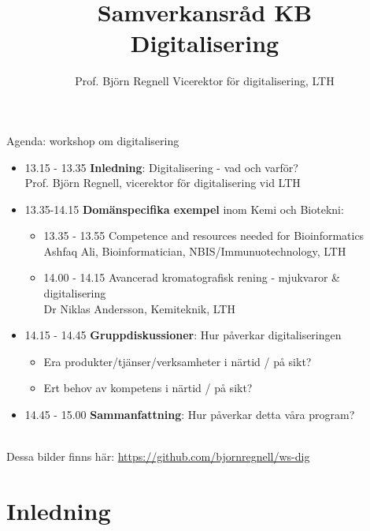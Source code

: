 \documentclass[aspectratio=169]{beamer}
\title[B. Regnell, \today]{\selectfont Samverkansråd KB\\ Digitalisering}
\author[\href{https://github.com/bjornregnell/ws-dig}{github.com/bjornregnell/ws-dig}]{%
  Prof. Björn Regnell\newline
  Vicerektor för digitalisering, LTH}
\newcommand{\TitleSlide}{\begin{frame}[plain]\titlepage\end{frame}}
\newenvironment{Slide}[1]%
  {\begin{frame}[environment=Slide]{#1}}
  {\end{frame}}%
\begin{document}
\TitleSlide


\begin{Slide}{Agenda: workshop om digitalisering}
\begin{itemize}
    \item 13.15 - 13.35  \textbf{Inledning}: Digitalisering - vad och varför?  \\ Prof. Björn Regnell, vicerektor för digitalisering vid LTH

    \item 13.35-14.15 \textbf{Domänspecifika exempel} inom Kemi och Biotekni:
    \begin{itemize}
      \item 13.35 - 13.55   Competence and resources needed for Bioinformatics  \\ Ashfaq Ali, Bioinformatician, NBIS/Immunuotechnology, LTH
      \item 14.00 - 14.15  Avancerad kromatografisk rening - mjukvaror \& digitalisering \\ Dr Niklas Andersson, Kemiteknik, LTH
    \end{itemize}
    
    \item 14.15 - 14.45  \textbf{Gruppdiskussioner}: 
    Hur påverkar digitaliseringen
    \begin{itemize}
      \item Era produkter/tjänser/verksamheter i närtid / på sikt?
      \item Ert behov av kompetens i närtid / på sikt?  
    \end{itemize}



    \item  14.45 - 15.00 \textbf{Sammanfattning}: Hur påverkar detta våra program?
\end{itemize}

~\\Dessa bilder finns här:  
\url{https://github.com/bjornregnell/ws-dig}
\end{Slide}

\section{Inledning}
\end{document}
